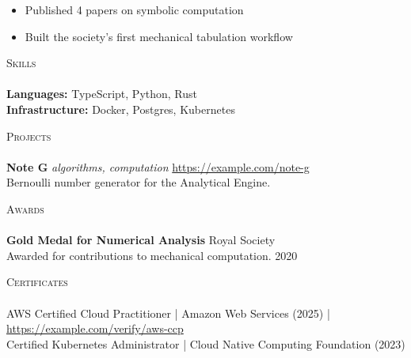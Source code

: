 \documentclass[a4paper]{article}
\newcommand{\lineunder} {
    \vspace*{-8pt} \\
    \hspace*{-18pt} \hrulefill \\
}
\newcommand{\header} [1] {
    {\hspace*{-18pt}\vspace*{3pt} \textsc{#1}}
    \vspace*{-3pt} \lineunder
}
\begin{document}
          \vspace{-1mm}
\begin{itemize} \itemsep 2pt
  \item Published 4 papers on symbolic computation
  \item Built the society's first mechanical tabulation workflow
\end{itemize}

\header{Skills}
\textbf{Languages:} TypeScript, Python, Rust \\
\textbf{Infrastructure:} Docker, Postgres, Kubernetes \\
\vspace{2mm}

\header{Projects}
      {\textbf{Note G}} {\sl algorithms, computation} \hfill \href{https://example.com/note-g}{https://example.com/note-g}\\
Bernoulli number generator for the Analytical Engine.\\
\vspace*{2mm}

\header{Awards}
      \textbf{Gold Medal for Numerical Analysis} \hfill Royal Society\\
Awarded for contributions to mechanical computation. \hfill 2020\\
\vspace*{2mm}

\header{Certificates}
AWS Certified Cloud Practitioner | Amazon Web Services (2025) | \href{https://example.com/verify/aws-ccp}{https://example.com/verify/aws-ccp}\\
Certified Kubernetes Administrator | Cloud Native Computing Foundation (2023)\\

    \ 
    
\end{document}
